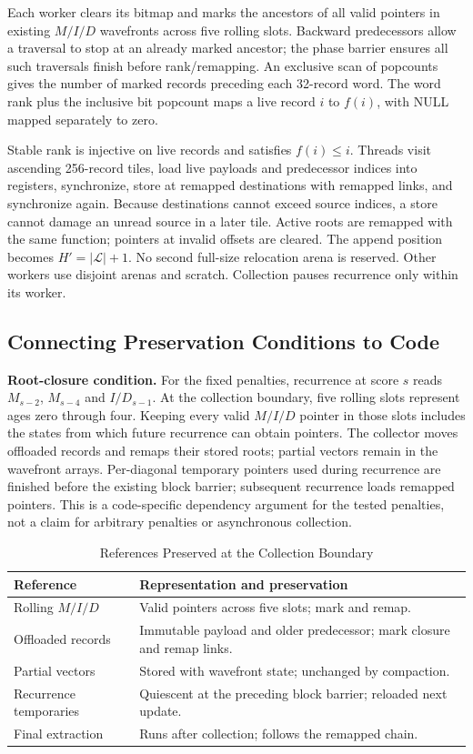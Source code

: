 \documentclass[conference,a4paper]{IEEEtran}
\begin{document}
Each worker clears its bitmap and marks the ancestors of all valid pointers in existing $M/I/D$ wavefronts across five rolling slots. Backward predecessors allow a traversal to stop at an already marked ancestor; the phase barrier ensures all such traversals finish before rank/remapping. An exclusive scan of popcounts gives the number of marked records preceding each 32-record word. The word rank plus the inclusive bit popcount maps a live record $i$ to $f(i)$, with NULL mapped separately to zero.

Stable rank is injective on live records and satisfies $f(i)\leq i$. Threads visit ascending 256-record tiles, load live payloads and predecessor indices into registers, synchronize, store at remapped destinations with remapped links, and synchronize again. Because destinations cannot exceed source indices, a store cannot damage an unread source in a later tile. Active roots are remapped with the same function; pointers at invalid offsets are cleared. The append position becomes $H'=|\mathcal L|+1$. No second full-size relocation arena is reserved. Other workers use disjoint arenas and scratch. Collection pauses recurrence only within its worker.

\subsection{Connecting Preservation Conditions to Code}
\textbf{Root-closure condition.} For the fixed penalties, recurrence at score $s$ reads $M_{s-2}$, $M_{s-4}$ and $I/D_{s-1}$. At the collection boundary, five rolling slots represent ages zero through four. Keeping every valid $M/I/D$ pointer in those slots includes the states from which future recurrence can obtain pointers. The collector moves offloaded records and remaps their stored roots; partial vectors remain in the wavefront arrays. Per-diagonal temporary pointers used during recurrence are finished before the existing block barrier; subsequent recurrence loads remapped pointers. This is a code-specific dependency argument for the tested penalties, not a claim for arbitrary penalties or asynchronous collection.

\begin{table}[t]
\caption{References Preserved at the Collection Boundary}
\label{tab:roots}\centering
\begin{tabular}{>{\raggedright\arraybackslash}p{}>{\raggedright\arraybackslash}p{}}\toprule
Reference & Representation and preservation\\\midrule
Rolling $M/I/D$ & Valid pointers across five slots; mark and remap.\\
Offloaded records & Immutable payload and older predecessor; mark closure and remap links.\\
Partial vectors & Stored with wavefront state; unchanged by compaction.\\
Recurrence temporaries & Quiescent at the preceding block barrier; reloaded next update.\\
Final extraction & Runs after collection; follows the remapped chain.\\\bottomrule
\end{tabular}
\end{table}
\end{document}
